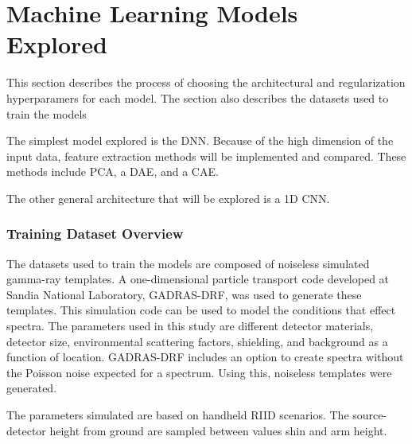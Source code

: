 \chapter{Machine Learning Models Explored}

This section describes the process of choosing the architectural and regularization hyperparamers for each model. The section also describes the datasets used to train the models 

The simplest model explored is the DNN. Because of the high dimension of the input data, feature extraction methods will be implemented and compared. These methods include PCA, a DAE, and a CAE. 

The other general architecture that will be explored is a 1D CNN. 

\subsection{Training Dataset Overview}

The datasets used to train the models are composed of noiseless simulated gamma-ray templates. A one-dimensional particle transport code developed at Sandia National Laboratory, GADRAS-DRF, was used to generate these templates. This simulation code can be used to model the conditions that effect spectra. The parameters used in this study are different detector materials, detector size, environmental scattering factors, shielding, and background as a function of location. GADRAS-DRF includes an option to create spectra without the Poisson noise expected for a spectrum. Using this, noiseless templates were generated.

The parameters simulated are based on handheld RIID scenarios. The source-detector height from ground are sampled between values shin and arm height. 


